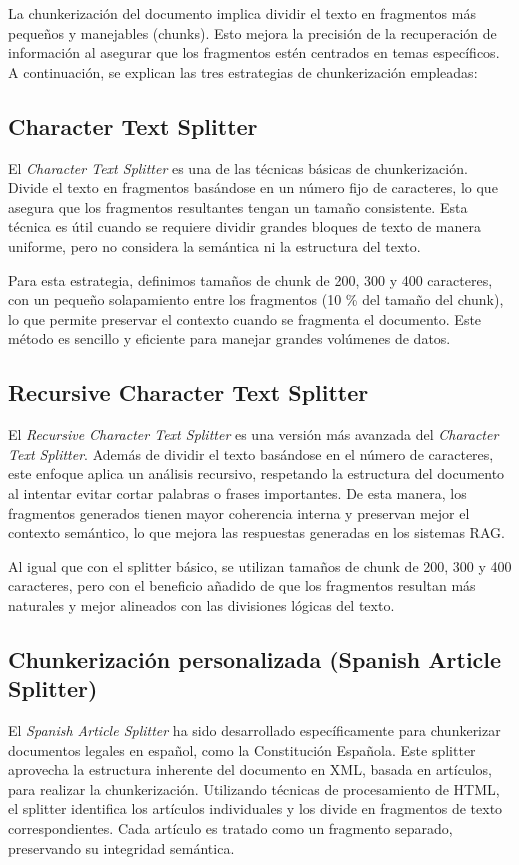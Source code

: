 La chunkerización del documento implica dividir el texto en fragmentos más pequeños y manejables (chunks). Esto mejora la precisión de la recuperación de información al asegurar que los fragmentos estén centrados en temas específicos. A continuación, se explican las tres estrategias de chunkerización empleadas:

\subsection{Character Text Splitter}
El \textit{Character Text Splitter} es una de las técnicas básicas de chunkerización. Divide el texto en fragmentos basándose en un número fijo de caracteres, lo que asegura que los fragmentos resultantes tengan un tamaño consistente. Esta técnica es útil cuando se requiere dividir grandes bloques de texto de manera uniforme, pero no considera la semántica ni la estructura del texto.

Para esta estrategia, definimos tamaños de chunk de 200, 300 y 400 caracteres, con un pequeño solapamiento entre los fragmentos (10 \% del tamaño del chunk), lo que permite preservar el contexto cuando se fragmenta el documento. Este método es sencillo y eficiente para manejar grandes volúmenes de datos.

\subsection{Recursive Character Text Splitter}
El \textit{Recursive Character Text Splitter} es una versión más avanzada del \textit{Character Text Splitter}. Además de dividir el texto basándose en el número de caracteres, este enfoque aplica un análisis recursivo, respetando la estructura del documento al intentar evitar cortar palabras o frases importantes. De esta manera, los fragmentos generados tienen mayor coherencia interna y preservan mejor el contexto semántico, lo que mejora las respuestas generadas en los sistemas RAG.

Al igual que con el splitter básico, se utilizan tamaños de chunk de 200, 300 y 400 caracteres, pero con el beneficio añadido de que los fragmentos resultan más naturales y mejor alineados con las divisiones lógicas del texto.

\subsection{Chunkerización personalizada (Spanish Article Splitter)}
El \textit{Spanish Article Splitter} ha sido desarrollado específicamente para chunkerizar documentos legales en español, como la Constitución Española. Este splitter aprovecha la estructura inherente del documento en XML, basada en artículos, para realizar la chunkerización. Utilizando técnicas de procesamiento de HTML, el splitter identifica los artículos individuales y los divide en fragmentos de texto correspondientes. Cada artículo es tratado como un fragmento separado, preservando su integridad semántica.

